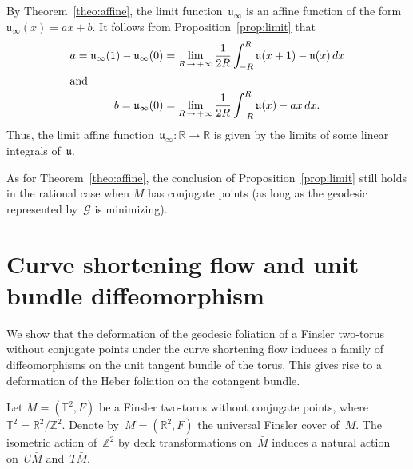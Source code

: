 \documentclass[AHL,Unicode,longabstracts,published]{cedram}
\newcommand{\clG}{\mathcal{G}}
\newcommand{\Z}{\mathbb{Z}}
\newcommand{\R}{\mathbb{R}}
\newcommand{\T}{\mathbb{T}}
\newcommand{\bu}{\mathfrak{u}}
\begin{document}
\begin{rema}
By Theorem~\ref{theo:affine}, the limit function~$\bu_\infty$ is an affine function of the form~$\bu_\infty(x)=ax+b$. It follows from Proposition~\ref{prop:limit} that
\begin{align}
a = \bu_\infty(1) - \bu_\infty(0) &= \lim_{R\,\to\,+\infty} \frac{1}{2R} \int_{-R}^R \bu(x+1) - \bu(x) \, dx\label{eq:lima}
\\
\intertext{and}
b = \bu_\infty(0) &= \lim_{R\,\to\,+\infty} \frac{1}{2R} \int_{-R}^R \bu(x) - ax \, dx.\label{eq:limb}
\end{align}
Thus, the limit affine function~$\bu_\infty:\R \to \R$ is given by the limits of some linear integrals of~$\bu$.
\end{rema}


\begin{rema}
As for Theorem~\ref{theo:affine}, the conclusion of Proposition~\ref{prop:limit} still holds in the rational case when $M$ has conjugate points (as long as the geodesic represented by~$\clG$ is minimizing).
\end{rema}


\section{Curve shortening flow and unit bundle diffeomorphism} \label{sec:diffeo}

We show that the deformation of the geodesic foliation of a Finsler two-torus without conjugate points under the curve shortening flow induces a family of diffeomorphisms on the unit tangent bundle of the torus. This gives rise to a deformation of the Heber foliation on the cotangent bundle.

Let $M=(\T^2,F)$ be a Finsler two-torus without conjugate points, where $\T^2=\R^2/\Z^2$. Denote by~$\bar{M}=(\R^2,\bar{F})$ the universal Finsler cover of~$M$. The isometric action of~$\Z^2$ by deck transformations on~$\bar{M}$ induces a natural action on~$U\bar{M}$ and~$T\bar{M}$.
\end{document}

